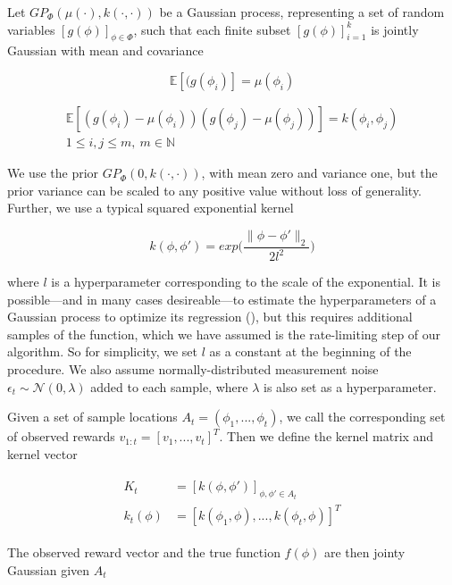 \documentclass{amsart}
\begin{document}
Let $GP_\Phi(\mu(\cdot),k(\cdot,\cdot))$ be a Gaussian process, representing a set of random variables $[g(\phi)]_{\phi\in\Phi}$, such that each finite subset $[g(\phi)]_{i=1}^k$ is jointly Gaussian with mean and covariance

\begin{equation}
    \mathbb{E}[(g(\phi_i)] = \mu(\phi_i)
    \label{eq:jointmean}
\end{equation}

\begin{multline}
    \mathbb{E}[(g(\phi_i)-\mu(\phi_i))(g(\phi_j)-\mu(\phi_j))]=k(\phi_i,\phi_j) \\
    1\leq i,j\leq m,\ m\in \mathbb{N}
    \label{eq:jointcov}
\end{multline}
\smallskip

We use the prior $GP_\Phi(0,k(\cdot,\cdot))$, with mean zero and variance one, but the prior variance can be scaled to any positive value without loss of generality. Further, we use a typical squared exponential kernel

\begin{equation}
    k(\phi,\phi') = exp\bigg(\frac{\|\phi-\phi'\|_2}{2l^2}\bigg)
\end{equation}

where $l$ is a hyperparameter corresponding to the scale of the exponential. It is possible---and in many cases desireable---to estimate the hyperparameters of a Gaussian process to optimize its regression (\cite{blum13,chen16}), but this requires additional samples of the function, which we have assumed is the rate-limiting step of our algorithm. So for simplicity, we set $l$ as a constant at the beginning of the procedure. We also assume normally-distributed measurement noise $\epsilon_t\sim\mathcal{N}(0,\lambda)$ added to each sample, where $\lambda$ is also set as a hyperparameter.

Given a set of sample locations $A_t=(\phi_1,...,\phi_t)$, we call the corresponding set of observed rewards $v_{1:t}=[v_1,...,v_t]^T$. Then we define the kernel matrix and kernel vector

\begin{align}
\begin{split}
    K_t &= [k(\phi,\phi')]_{\phi,\phi'\in A_t} \\
    k_t(\phi) &= [k(\phi_1,\phi),...,k(\phi_t,\phi)]^T
\end{split}
\end{align}
\smallskip

The observed reward vector and the true function $f(\phi)$ are then jointy Gaussian given $A_t$
\end{document}
